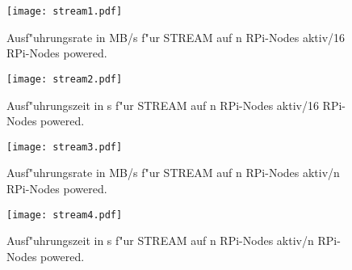 \begin{figure}[htb]
  \centering
  \texttt{[image: stream1.pdf]}\\ 
  \caption{Ausf"uhrungsrate in MB/s f"ur STREAM auf n RPi-Nodes aktiv/16 RPi-Nodes powered.}
  \label{fig:stream1}		
\end{figure}
\begin{figure}[htb]
  \centering
  \texttt{[image: stream2.pdf]}\\ 
  \caption{Ausf"uhrungszeit in s f"ur STREAM auf n RPi-Nodes aktiv/16 RPi-Nodes powered.}
  \label{fig:stream2}		
\end{figure}
\begin{figure}[htb]
  \centering
  \texttt{[image: stream3.pdf]}\\ 
  \caption{Ausf"uhrungsrate in MB/s f"ur STREAM auf n RPi-Nodes aktiv/n RPi-Nodes powered.}
  \label{fig:stream3}		
\end{figure}
\begin{figure}[htb]
  \centering
  \texttt{[image: stream4.pdf]}\\ 
  \caption{Ausf"uhrungszeit in s f"ur STREAM auf n RPi-Nodes aktiv/n RPi-Nodes powered.}
  \label{fig:stream4}		
\end{figure}

\endinput 



